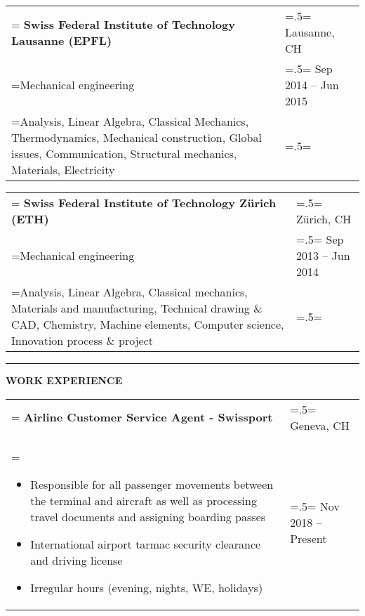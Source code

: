 \documentclass[letterpaper, 11pt]{article}
\begin{document}
\begin{tabularx}{1.0\textwidth} { 
   >{\raggedright\arraybackslash\hsize=1.5\hsize\linewidth=\hsize}X 
   >{\raggedleft\arraybackslash\hsize=.5\hsize\linewidth=\hsize}X }
\normalsize
\bf{Swiss Federal Institute of Technology Lausanne (EPFL)} & Lausanne, CH \\
\normalfont Mechanical engineering & Sep 2014 -- Jun 2015\\
Analysis, Linear Algebra, Classical Mechanics, Thermodynamics, Mechanical construction, Global issues, Communication, Structural mechanics, Materials, Electricity
\end{tabularx}
\vspace{0.25cm}

\begin{tabularx}{1.0\textwidth} { 
   >{\raggedright\arraybackslash\hsize=1.5\hsize\linewidth=\hsize}X 
   >{\raggedleft\arraybackslash\hsize=.5\hsize\linewidth=\hsize}X }
\normalsize
\bf{Swiss Federal Institute of Technology Zürich (ETH)} & Zürich, CH \\
\normalfont Mechanical engineering & Sep 2013 -- Jun 2014 \\
Analysis, Linear Algebra, Classical mechanics, Materials and manufacturing, Technical drawing \& CAD, Chemistry, Machine elements, Computer science, Innovation process \& project
\end{tabularx}
\vspace{0.25cm}

\begin{center}
\noindent\rule{0.75\textwidth}{1pt}
\end{center}

\begin{center}
\large\bf{WORK EXPERIENCE}
\end{center}

\begin{tabularx}{1.0\textwidth} { 
   >{\raggedright\arraybackslash\hsize=1.5\hsize\linewidth=\hsize}X 
   >{\raggedleft\arraybackslash\hsize=.5\hsize\linewidth=\hsize}X }
\normalsize
\bf{Airline Customer Service Agent - Swissport} & Geneva, CH\\
\normalfont \begin{itemize}[leftmargin=*,noitemsep,topsep=0pt]
\item Responsible for all passenger movements between the terminal and aircraft as well as processing travel documents and assigning boarding passes
\item International airport tarmac security clearance and driving license
\item Irregular hours (evening, nights, WE, holidays)
\end{itemize} & Nov 2018 -- Present
\end{tabularx}
\end{document}
